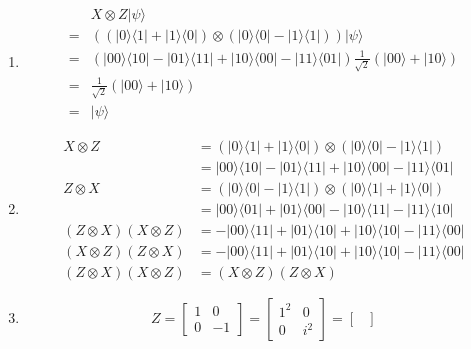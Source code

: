\documentclass{assignment}
\newcommand{\ket}[1]{\ensuremath{|{#1}\rangle}}
\newcommand{\bra}[1]{\ensuremath{\langle{#1}|}}
\begin{document}
\begin{problemlist}

  \pbitem
  \begin{problem}
  \end{problem}
  \begin{answer}
    \begin{enumerate}
    \item 
      \begin{align*}
        &X \otimes Z \ket{\psi}\\
        =&((\ket{0}\bra{1}+\ket{1}\bra{0}) \otimes (\ket{0}\bra{0}-\ket{1}\bra{1}))\ket{\psi}\\
        =&(\ket{00}\bra{10}-\ket{01}\bra{11}+\ket{10}\bra{00}-\ket{11}\bra{01})\frac{1}{\sqrt{2}}(\ket{00}+\ket{10})\\
        =&\frac{1}{\sqrt{2}}(\ket{00}+\ket{10})\\
        =&\ket{\psi}
      \end{align*}
      \item \begin{align*}
        X \otimes Z&=(\ket{0}\bra{1}+\ket{1}\bra{0}) \otimes (\ket{0}\bra{0}-\ket{1}\bra{1})\\
        &=\ket{00}\bra{10}-\ket{01}\bra{11}+\ket{10}\bra{00}-\ket{11}\bra{01}\\
        Z \otimes X&=(\ket{0}\bra{0}-\ket{1}\bra{1}) \otimes (\ket{0}\bra{1}+\ket{1}\bra{0})\\
        &=\ket{00}\bra{01}+\ket{01}\bra{00}-\ket{10}\bra{11}-\ket{11}\bra{10}\\
        (Z \otimes X)(X \otimes Z)&=-\ket{00}\bra{11} + \ket{01}\bra{10} + \ket{10}\bra{10} -\ket{11}\bra{00}\\
        (X \otimes Z)(Z \otimes X)&=-\ket{00}\bra{11} + \ket{01}\bra{10} + \ket{10}\bra{10} -\ket{11}\bra{00}\\
        (Z \otimes X)(X \otimes Z)&=(X \otimes Z)(Z \otimes X)
      \end{align*}
      \item
        \[
        Z = 
        \begin{bmatrix}
          1 & 0\\
          0 & -1
        \end{bmatrix}
        =
        \begin{bmatrix}
          1^2 & 0\\
          0 & i^2
        \end{bmatrix}
        =
        \begin{bmatrix}

\end{bmatrix}\]
\end{enumerate}
\end{answer}
\end{problemlist}
\end{document}
